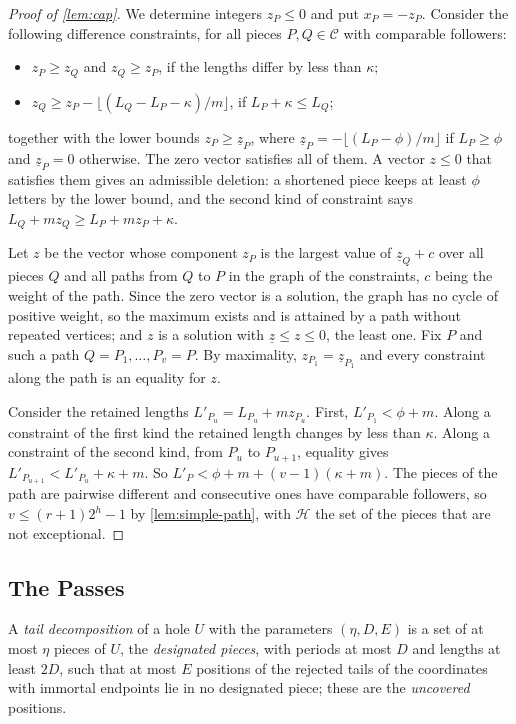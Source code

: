 \begin{proof}[Proof of \cref{lem:cap}]
We determine integers $z_P\le0$ and put $x_P=-z_P$. Consider the following
difference constraints, for all pieces $P,Q\in\mathcal C$ with comparable
followers:
\begin{itemize}
\item $z_P\ge z_Q$ and $z_Q\ge z_P$, if the lengths differ by less than
  $\kappa$;
\item $z_Q\ge z_P-\lfloor(L_Q-L_P-\kappa)/m\rfloor$, if $L_P+\kappa\le
  L_Q$;
\end{itemize}
together with the lower bounds $z_P\ge\underline z_P$, where
$\underline z_P=-\lfloor(L_P-\phi)/m\rfloor$ if $L_P\ge\phi$ and
$\underline z_P=0$ otherwise. The zero vector satisfies all of them. A
vector $z\le0$ that satisfies them gives an admissible deletion: a
shortened piece keeps at least $\phi$ letters by the lower bound, and the
second kind of constraint says $L_Q+mz_Q\ge L_P+mz_P+\kappa$.

Let $z$ be the vector whose component $z_P$ is the largest value of
$\underline z_{Q}+c$ over all pieces $Q$ and all paths from $Q$ to $P$ in
the graph of the constraints, $c$ being the weight of the path. Since the
zero vector is a solution, the graph has no cycle of positive weight, so
the maximum exists and is attained by a path without repeated vertices; and
$z$ is a solution with $\underline z\le z\le0$, the least one. Fix $P$ and
such a path $Q=P_1,\dots,P_v=P$. By maximality, $z_{P_1}=\underline
z_{P_1}$ and every constraint along the path is an equality for $z$.

Consider the retained lengths $L'_{P_u}=L_{P_u}+mz_{P_u}$. First,
$L'_{P_1}<\phi+m$. Along a constraint of the first kind the retained length
changes by less than $\kappa$. Along a constraint of the second kind, from
$P_u$ to $P_{u+1}$, equality gives $L'_{P_{u+1}}<L'_{P_u}+\kappa+m$. So
$L'_P<\phi+m+(v-1)(\kappa+m)$. The pieces of the path are pairwise different
and consecutive ones have comparable followers, so $v\le(r+1)2^h-1$ by
\cref{lem:simple-path}, with $\mathcal H$ the set of the pieces that are
not exceptional.
\end{proof}

\subsection{The Passes}\label{app:compression-passes}

A \emph{tail decomposition} of a hole $U$ with the parameters $(\eta,D,E)$
is a set of at most $\eta$ pieces of $U$, the \emph{designated pieces}, with
periods at most $D$ and lengths at least $2D$, such that at most $E$
positions of the rejected tails of the coordinates with immortal endpoints
lie in no designated piece; these are the \emph{uncovered} positions.

